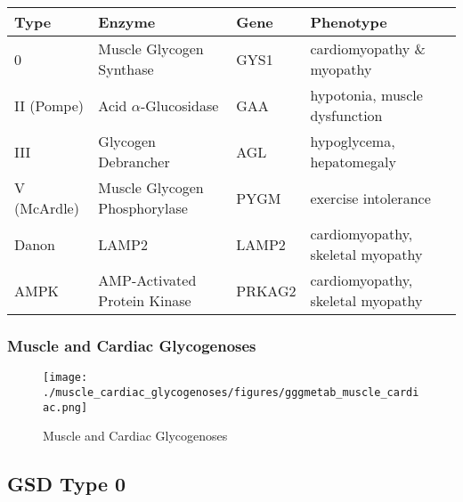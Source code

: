 \documentclass{scrartcl}
\begin{document}
\scriptsize
\begin{center}
\begin{tabular}{llll}
Type & Enzyme & Gene & Phenotype\\
\hline
0 & Muscle Glycogen Synthase & GYS1 & cardiomyopathy \& myopathy\\
II (Pompe) & Acid \(\alpha\)-Glucosidase & GAA & hypotonia, muscle dysfunction\\
III & Glycogen Debrancher & AGL & hypoglycema, hepatomegaly\\
V (McArdle) & Muscle Glycogen Phosphorylase & PYGM & exercise intolerance\\
Danon & LAMP2 & LAMP2 & cardiomyopathy, \textpm{} skeletal myopathy\\
AMPK & AMP-Activated Protein Kinase & PRKAG2 & cardiomyopathy, \textpm{} skeletal myopathy\\
\end{tabular}
\end{center}


\subsubsection{Muscle and Cardiac Glycogenoses}
\label{sec:orge33a5dc}

\begin{figure}[htbp]
\centering
\texttt{[image: ./muscle\_cardiac\_glycogenoses/figures/gggmetab\_muscle\_cardiac.png]}
\caption[Muscle and Cardiac Glycogenoses]{\label{fig:orgdd7b88c}
Muscle and Cardiac Glycogenoses}
\end{figure}

\subsection{GSD Type 0}
\label{sec:org1d2053a}
\end{document}
